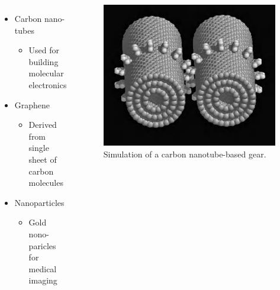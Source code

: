 \documentclass[11pt,dvipsnames,ignorenonframetext,aspectratio=169]{beamer}
\providecommand{\tightlist}{%
  \setlength{\itemsep}{0pt}\setlength{\parskip}{0pt}}
\newcommand{\bcolumns}{\begin{columns}[T, onlytextwidth]}
\newcommand{\ecolumns}{\end{columns}}
\begin{document}
\begin{frame}{}
\protect\hypertarget{section-2}{}
\bcolumns
{}

\begin{itemize}
\tightlist
\item
  Carbon nano-tubes

  \begin{itemize}
  \tightlist
  \item
    Used for building molecular electronics
  \end{itemize}
\item
  Graphene

  \begin{itemize}
  \tightlist
  \item
    Derived from single sheet of carbon molecules
  \end{itemize}
\item
  Nanoparticles

  \begin{itemize}
  \tightlist
  \item
    Gold nono-paricles for medical imaging
  \end{itemize}
\end{itemize}


\begin{figure}
\includegraphics[width=0.7\linewidth]{../images/carbon_nanotubes} \caption{Simulation of a carbon nanotube-based gear.}\label{fig:carbon-nanotubes}
\end{figure}

\ecolumns
\end{frame}
\end{document}
